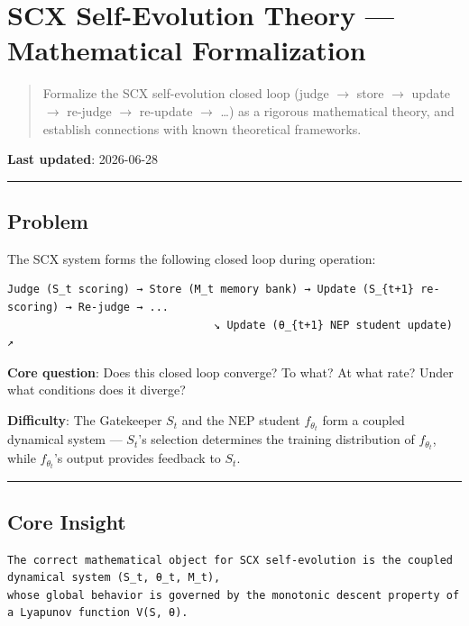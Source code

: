 \documentclass[
  12pt,
]{article}
\author{SCX}
\date{2026}
\begin{document}
\section{SCX Self-Evolution Theory --- Mathematical Formalization}\label{scx-self-evolution-theory-mathematical-formalization}

\begin{quote}
Formalize the SCX self-evolution closed loop (judge $\to$ store $\to$ update $\to$ re-judge $\to$ re-update $\to$ \ldots) as a rigorous mathematical theory, and establish connections with known theoretical frameworks.
\end{quote}

\textbf{Last updated}: 2026-06-28

\begin{center}\rule{0.5\linewidth}{0.5pt}\end{center}

\subsection{Problem}\label{problem}

The SCX system forms the following closed loop during operation:

\begin{verbatim}
Judge (S_t scoring) → Store (M_t memory bank) → Update (S_{t+1} re-scoring) → Re-judge → ...
                                ↘ Update (θ_{t+1} NEP student update) ↗
\end{verbatim}

\textbf{Core question}: Does this closed loop converge? To what? At what rate? Under what conditions does it diverge?

\textbf{Difficulty}: The Gatekeeper $S_t$ and the NEP student $f_{\theta_t}$ form a coupled dynamical system --- $S_t$'s selection determines the training distribution of $f_{\theta_t}$, while $f_{\theta_t}$'s output provides feedback to $S_t$.

\begin{center}\rule{0.5\linewidth}{0.5pt}\end{center}

\subsection{Core Insight}\label{core-insight}

\begin{verbatim}
The correct mathematical object for SCX self-evolution is the coupled dynamical system (S_t, θ_t, M_t),
whose global behavior is governed by the monotonic descent property of a Lyapunov function V(S, θ).
\end{verbatim}
\end{document}
